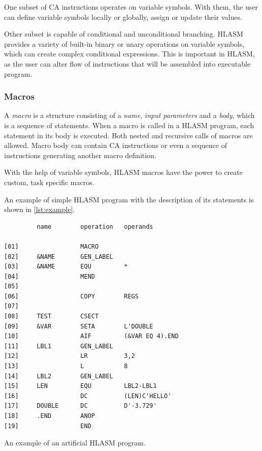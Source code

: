 One subset of CA instructions operates on variable symbols. With them, the user can define variable symbols locally or globally, assign or update their values.

Other subset is capable of conditional and unconditional branching. HLASM provides a variety of built-in binary or unary operations on variable symbols, which can create complex conditional expressions. This is important in HLASM, as the user can alter flow of instructions that will be assembled into executable program.

\subsubsection{Macros}

A \emph{macro} is a structure consisting of a \emph{name}, \emph{input parameters} and a \emph{body}, which is a sequence of statements. When a macro is called in a HLASM program, each statement in its body is executed. Both nested and recursive calls of macros are allowed. Macro body can contain CA instructions or even a sequence of instructions generating another macro definition.

With the help of variable symbols, HLASM macros have the power to create custom, task specific macros.

\vspace{5mm}

An example of simple HLASM program with the description of its statements is shown in \cref{lst:example}.
\begin{listing}
\begin{verbatim}
         name        operation   operands
         
[01]                 MACRO                   
[02]     &NAME       GEN_LABEL
[03]     &NAME       EQU         *
[04]                 MEND
[05]             
[06]                 COPY        REGS
[07]             
[08]     TEST        CSECT
[09]     &VAR        SETA        L'DOUBLE
[10]                 AIF         (&VAR EQ 4).END
[11]     LBL1        GEN_LABEL
[12]                 LR          3,2
[13]                 L           8
[14]     LBL2        GEN_LABEL
[15]     LEN         EQU         LBL2-LBL1
[16]                 DC          (LEN)C'HELLO'
[17]     DOUBLE      DC          D'-3.729'
[18]     .END        ANOP
[19]                 END
\end{verbatim} 
\caption{An example of an artificial HLASM program.}
\label{lst:example}
\end{listing}

